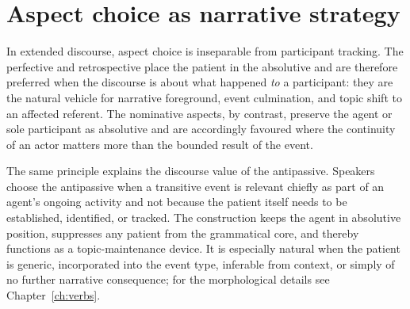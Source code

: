 
\section{Aspect choice as narrative strategy}\label{sec:aspect-narrative}


In extended discourse, aspect choice is inseparable from participant tracking. The perfective and retrospective place the patient in the absolutive and are therefore preferred when the discourse is about what happened \emph{to} a participant: they are the natural vehicle for narrative foreground, event culmination, and topic shift to an affected referent. The nominative aspects, by contrast, preserve the agent or sole participant as absolutive and are accordingly favoured where the continuity of an actor matters more than the bounded result of the event.

The same principle explains the discourse value of the antipassive. Speakers choose the antipassive when a transitive event is relevant chiefly as part of an agent's ongoing activity and not because the patient itself needs to be established, identified, or tracked. The construction keeps the agent in absolutive position, suppresses any patient from the grammatical core, and thereby functions as a topic-maintenance device. It is especially natural when the patient is generic, incorporated into the event type, inferable from context, or simply of no further narrative consequence; for the morphological details see Chapter~\ref{ch:verbs}.

